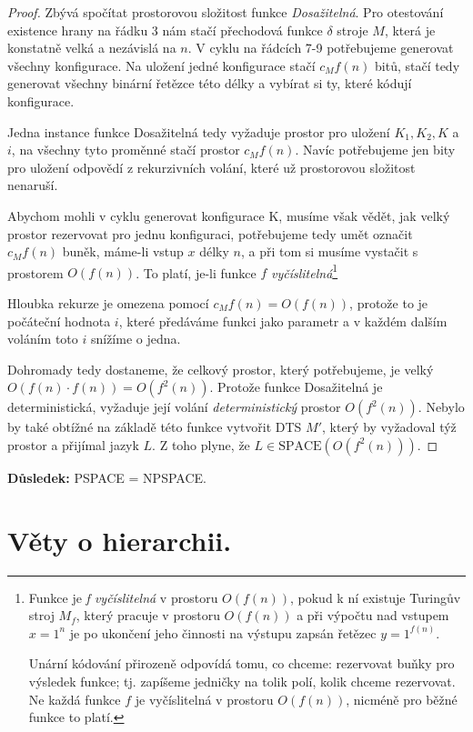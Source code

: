 \documentclass[11pt]{report} %
\numberwithin{equation}{section}
\begin{document}
\begin{proof}
Zbývá spočítat prostorovou složitost funkce \textit{Dosažitelná}. Pro otestování existence hrany na řádku 3 nám stačí přechodová funkce $\delta$ stroje $M$, která je konstatně velká a nezávislá na $n$. V cyklu na řádcích 7-9 potřebujeme generovat všechny konfigurace. Na uložení jedné konfigurace stačí $c_Mf(n)$ bitů, stačí tedy generovat všechny binární řetězce této délky a vybírat si ty, které kódují konfigurace.

Jedna instance funkce Dosažitelná tedy vyžaduje prostor pro uložení $K_1, K_2, K$ a $i$, na všechny tyto proměnné stačí prostor $c_Mf(n)$. Navíc potřebujeme jen bity pro uložení odpovědí z rekurzivních volání, které už prostorovou složitost nenaruší. 

Abychom mohli v cyklu generovat konfigurace K, musíme však vědět, jak velký prostor rezervovat pro jednu konfiguraci,
potřebujeme tedy umět označit $c_Mf(n)$ buněk, máme-li vstup $x$ délky $n$, a při tom si musíme vystačit s prostorem $O(f(n))$. To platí, je-li funkce $f$ \textit{vyčíslitelná}\footnote{Funkce je \textit{f vyčíslitelná} v prostoru $O(f(n))$, pokud k ní existuje Turingův stroj $M_f$, který pracuje v prostoru $O(f(n))$ a při výpočtu nad vstupem $x = 1^n$ je po ukončení jeho činnosti na výstupu zapsán řetězec $y = 1^{f(n)}$. 

Unární kódování přirozeně odpovídá tomu, co chceme: rezervovat buňky pro výsledek funkce; tj. zapíšeme jedničky na tolik polí, kolik chceme rezervovat. Ne každá funkce $f$ je vyčíslitelná v prostoru $O(f(n))$, nicméně pro běžné funkce to platí.}

Hloubka rekurze je omezena pomocí $c_Mf(n) = O(f(n))$, protože to je počáteční hodnota $i$, které předáváme funkci jako parametr a v každém dalším voláním toto $i$ snížíme o jedna. 

Dohromady tedy dostaneme, že celkový prostor, který potřebujeme, je velký $O(f(n) \cdot f(n)) = O(f^2(n))$. Protože funkce Dosažitelná je deterministická, vyžaduje její volání \textit{deterministický} prostor $O(f^2(n))$. Nebylo by také obtížné na základě této funkce vytvořit DTS $M'$, který by vyžadoval týž prostor a přijímal jazyk $L$. Z toho plyne, že
$L \in \text{SPACE}(O(f^2(n)))$.
\end{proof}

\noindent\textbf{Důsledek:} PSPACE = NPSPACE.

\section{Věty o hierarchii.}
\end{document}
